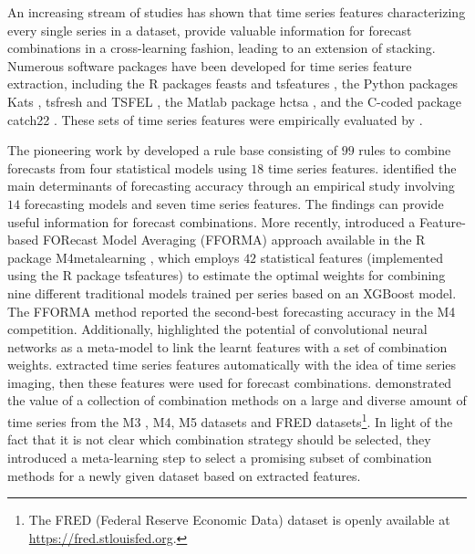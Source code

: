 \documentclass[a4paper,11pt]{article}
\newcommand{\pkg}[1]{{\normalfont\fontseries{b}\selectfont #1}}
\let\proglang=\textsf
\begin{document}
An increasing stream of studies has shown that time series features characterizing every single series in a dataset, provide valuable information for forecast combinations in a cross-learning fashion, leading to an extension of stacking. Numerous software packages have been developed for time series feature extraction, including the \proglang{R} packages \pkg{feasts} \citep{rfeasts} and \pkg{tsfeatures} \citep{rtsfeatures}, the \proglang{Python} packages \pkg{Kats} \citep{pKats}, \pkg{tsfresh} \citep{Christ2018-vi} and \pkg{TSFEL} \citep{Barandas2020-vr}, the \proglang{Matlab} package \pkg{hctsa} \citep{Fulcher2017-uf}, and the \proglang{C}-coded package \pkg{catch22} \citep{Lubba2019-ds}. These sets of time series features were empirically evaluated by \citet{Henderson2021-gl}.

The pioneering work by \citet{Collopy1992-ey} developed a rule base consisting of $99$ rules to combine forecasts from four statistical models using $18$ time series features. \citet{Petropoulos2014-uy} identified the main determinants of forecasting accuracy through an empirical study involving $14$ forecasting models and seven time series features. The findings can provide useful information for forecast combinations. More recently, \citet{Montero-Manso2020-tq} introduced a Feature-based FORecast Model Averaging (FFORMA) approach available in the \proglang{R} package \pkg{M4metalearning} \citep{rfforma}, which employs $42$ statistical features (implemented using the \proglang{R} package \pkg{tsfeatures}) to estimate the optimal weights for combining nine different traditional models trained per series based on an XGBoost model. The FFORMA method reported the second-best forecasting accuracy in the M4 competition. Additionally, \citet{Ma2021-np} highlighted the potential of convolutional neural networks as a meta-model to link the learnt features with a set of combination weights. \citet{Li2020-od} extracted time series features automatically with the idea of time series imaging, then these features were used for forecast combinations. \citet{Gastinger2021-ey} demonstrated the value of a collection of combination methods on a large and diverse amount of time series from the M3 \citep{Makridakis2000-he}, M4, M5 \citep{Makridakis2020-fn} datasets and FRED datasets\footnote{The FRED (Federal Reserve Economic Data) dataset is openly available at \url{https://fred.stlouisfed.org}.}. In light of the fact that it is not clear which combination strategy should be selected, they introduced a meta-learning step to select a promising subset of combination methods for a newly given dataset based on extracted features.
\end{document}
